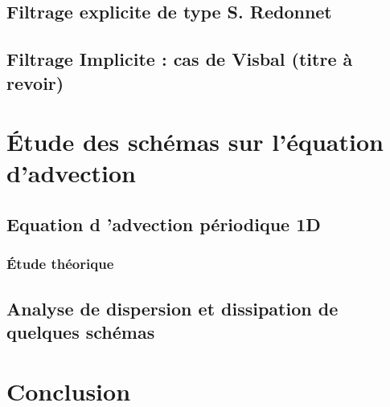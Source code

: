 \subsection{Filtrage explicite de type S. Redonnet}

\subsection{Filtrage Implicite : cas de Visbal (titre à revoir)}


\section{\'Etude des schémas sur l'équation d'advection}

\subsection{Equation d 'advection périodique 1D}

\subsubsection{\'Etude théorique}

\subsection{Analyse de dispersion et dissipation de quelques schémas}

\section{Conclusion}
